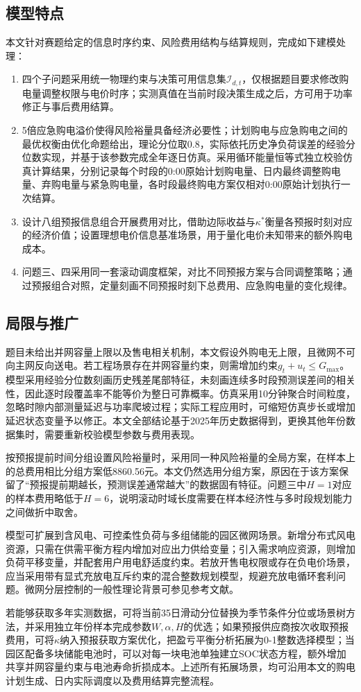 

\subsection{模型特点}
本文针对赛题给定的信息时序约束、风险费用结构与结算规则，完成如下建模处理：
\begin{enumerate}
    \item 四个子问题采用统一物理约束与决策可用信息集$\mathcal{I}_{d,t}$，仅根据题目要求修改购电量调整权限与电价时序；实测真值在当前时段决策生成之后，方可用于功率修正与事后费用结算。
    \item 5倍应急购电溢价使得风险裕量具备经济必要性；计划购电与应急购电之间的最优权衡由优化命题给出，理论分位取0.8，实际依托历史净负荷误差的经验分位数实现，并基于该参数完成全年逐日仿真。采用循环能量恒等式独立校验仿真计算结果，分别记录每个时段的0:00原始计划购电量、日内最终调整购电量、弃购电量与紧急购电量，各时段最终购电方案仅相对0:00原始计划执行一次结算。
    \item 设计八组预报信息组合开展费用对比，借助边际收益与$\kappa^*$衡量各预报时刻对应的经济价值；设置理想电价信息基准场景，用于量化电价未知带来的额外购电成本。
    \item 问题三、四采用同一套滚动调度框架，对比不同预报方案与合同调整策略；通过预报组合对照，定量刻画不同预报时刻下总费用、应急购电量的变化规律。
\end{enumerate}

\subsection{局限与推广}
题目未给出并网容量上限以及售电相关机制，本文假设外购电无上限，且微网不可向主网反向送电。若工程场景存在并网容量约束，则需增加约束$g_t+u_t \le G_{\text{max}}$。模型采用经验分位数刻画历史残差尾部特征，未刻画连续多时段预测误差间的相关性，因此逐时段覆盖率不能等价为整日可靠概率。仿真采用10分钟聚合时间粒度，忽略时隙内部测量延迟与功率爬坡过程；实际工程应用时，可缩短仿真步长或增加延迟状态变量予以修正。本文全部结论基于2025年历史数据得到，更换其他年份数据集时，需要重新校验模型参数与费用表现。

按预报提前时间分组设置风险裕量时，采用同一种风险裕量的全局方案，在样本上的总费用相比分组方案低8860.56元。本文仍然选用分组方案，原因在于该方案保留了“预报提前期越长，预测误差通常越大”的数据固有特征。问题三中$H=1$对应的样本费用略低于$H=6$，说明滚动时域长度需要在样本经济性与多时段规划能力之间做折中取舍。

模型可扩展到含风电、可控柔性负荷与多组储能的园区微网场景。新增分布式风电资源，只需在供需平衡方程内增加对应出力供给变量；引入需求响应资源，则增加负荷平移变量，并配套用户用电舒适度约束。若放开售电权限或存在负电价场景，应当采用带有显式充放电互斥约束的混合整数规划模型，规避充放电循环套利问题。微网分层控制的一般性理论背景可参见参考文献。

若能够获取多年实测数据，可将当前35日滑动分位替换为季节条件分位或场景树方法，并采用独立年份样本完成参数$W,\alpha,H$的优选；如果预报供应商按次收取预报费用，可将$\kappa$纳入预报获取方案优化，把盈亏平衡分析拓展为0-1整数选择模型；当园区配备多块储能电池时，可以对每一块电池单独建立SOC状态方程，额外增加共享并网容量约束与电池寿命折损成本。上述所有拓展场景，均可沿用本文的购电计划生成、日内实际调度以及费用结算完整流程。
